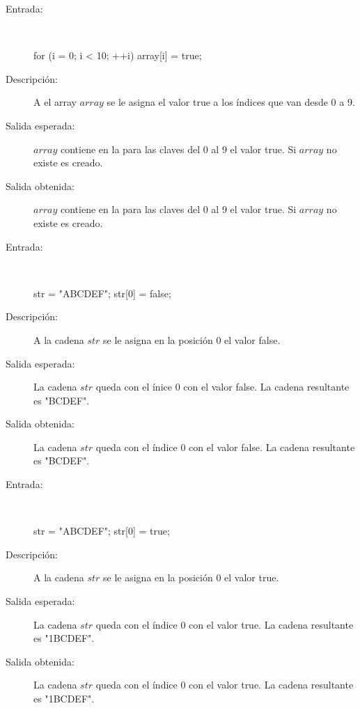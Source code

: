 	\begin{description}
		\item [Entrada:] \hfill \\
\begin{myverbatim}
 for (i = 0; i < 10; ++i) 
   array[i] = true;
\end{myverbatim}
		\item [Descripción:] A el array $array$ se le asigna el valor true a los índices que van desde 0 a 9.
		\item [Salida esperada:] $array$ contiene en la para las claves del 0 al 9 el valor true. Si $array$ no existe es creado.
		\item [Salida obtenida:] $array$ contiene en la para las claves del 0 al 9 el valor true. Si $array$ no existe es creado.
	\end{description}

	\begin{description}
		\item [Entrada:] \hfill \\
\begin{myverbatim}
 str = "ABCDEF"; 
 str[0] = false;
\end{myverbatim}
		\item [Descripción:] A la cadena $str$ se le asigna en la posición 0 el valor false.
		\item [Salida esperada:] La cadena $str$ queda con el ínice $0$ con el valor false. La cadena resultante es "BCDEF".
		\item [Salida obtenida:] La cadena $str$ queda con el índice $0$ con el valor false. La cadena resultante es "BCDEF".
	\end{description}
	\begin{description}
		\item [Entrada:] \hfill \\
\begin{myverbatim}
 str = "ABCDEF"; 
 str[0] = true;
\end{myverbatim}
		\item [Descripción:] A la cadena $str$ se le asigna en la posición 0 el valor true.
		\item [Salida esperada:] La cadena $str$ queda con el índice $0$ con el valor true. La cadena resultante es "1BCDEF".
		\item [Salida obtenida:] La cadena $str$ queda con el índice $0$ con el valor true. La cadena resultante es "1BCDEF".
	\end{description}

